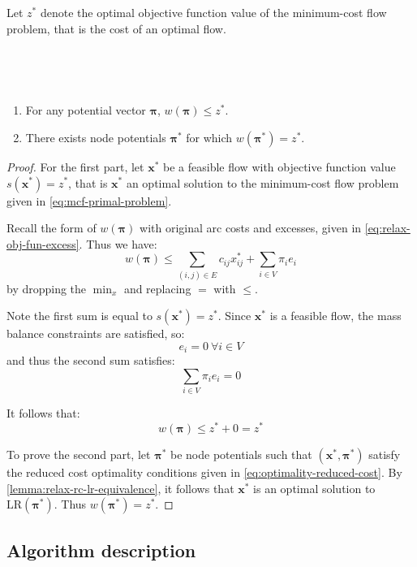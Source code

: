 \begin{defn}
Let $z^*$ denote the optimal objective function value of the minimum-cost flow problem, that is the cost of an optimal flow.
\end{defn}
~ %
\begin{lemma} \label{lemma:relax-dual-optimality}
~ %
\begin{enumerate}[label=(\alph*)]
    \item For any potential vector $\boldsymbol{\pi}$, $w(\boldsymbol{\pi}) \leq z^*$.
    \item There exists node potentials $\boldsymbol{\pi}^*$ for which $w(\boldsymbol{\pi}^*) = z^*$.
\end{enumerate}
\end{lemma}
\begin{proof}
For the first part, let $\mathbf{x}^*$ be a feasible flow with objective function value $s(\mathbf{x}^*) = z^*$, that is $\mathbf{x}^*$ an optimal solution to the minimum-cost flow problem given in \cref{eq:mcf-primal-problem}.

Recall the form of $w(\boldsymbol{\pi})$ with original arc costs and excesses, given in \cref{eq:relax-obj-fun-excess}. Thus we have:
\[w(\boldsymbol{\pi})\leq\sum_{\left(i,j\right)\in E}c_{ij}x_{ij}^{*}+\sum_{i\in V}\pi_{i}e_{i}\]
by dropping the $\min_x$ and replacing $=$ with $\leq$.

Note the first sum is equal to $s(\mathbf{x}^*) = z^*$. Since $\mathbf{x}^*$ is a feasible flow, the mass balance constraints are satisfied, so:
\[e_i = 0\:\forall i \in V\]
and thus the second sum satisfies:
\[\sum_{i \in V} \pi_i e_i = 0\]

It follows that:
\[w(\boldsymbol{\pi}) \leq z^* + 0 = z^*\]

To prove the second part, let $\boldsymbol{\pi}^*$ be node potentials such that $\left(\mathbf{x}^*,\boldsymbol{\pi}^*\right)$ satisfy the reduced cost optimality conditions given in \cref{eq:optimality-reduced-cost}\footnotemark. By \cref{lemma:relax-rc-lr-equivalence}, it follows that $\mathbf{x}^*$ is an optimal solution to $\mathrm{LR}(\boldsymbol{\pi}^*)$. Thus $w(\boldsymbol{\pi}^*) = z^*$.
\end{proof}


\subsection{Algorithm description}

